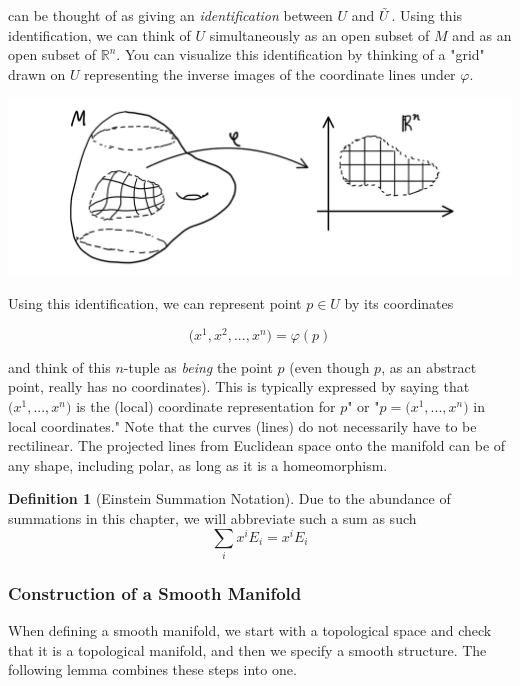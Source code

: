 \documentclass{article}
\theoremstyle{remark}
\theoremstyle{definition}
\newtheorem{definition}{Definition}[section]
\begin{document}
      can be thought of as giving an \textit{identification} between $U$ and $\Tilde{U}$. Using this identification, we can think of $U$ simultaneously as an open subset of $M$ and as an open subset of $\mathbb{R}^n$. You can visualize this identification by thinking of a "grid" drawn on $U$ representing the inverse images of the coordinate lines under $\varphi$. 

      \begin{center}
        \includegraphics[scale=0.25]{img/Grid_Identification.PNG}
      \end{center}

      Using this identification, we can represent point $p \in U$ by its coordinates

        \[\big( x^1, x^2, ..., x^n \big) = \varphi(p)\]

      and think of this $n$-tuple as \textit{being} the point $p$ (even though $p$, as an abstract point, really has no coordinates). This is typically expressed by saying that $\big( x^1, ..., x^n\big)$ is the (local) coordinate representation for $p$" or "$p = \big( x^1, ..., x^n\big)$ in local coordinates." Note that the curves (lines) do not necessarily have to be rectilinear. The projected lines from Euclidean space onto the manifold can be of any shape, including polar, as long as it is a homeomorphism. 

      \begin{definition}[Einstein Summation Notation]
        Due to the abundance of summations in this chapter, we will abbreviate such a sum as such 
          \[\sum_i x^i E_i = x^i E_i\]
      \end{definition}

    \subsubsection{Construction of a Smooth Manifold}

      When defining a smooth manifold, we start with a topological space and check that it is a topological manifold, and then we specify a smooth structure. The following lemma combines these steps into one. 
\end{document}
